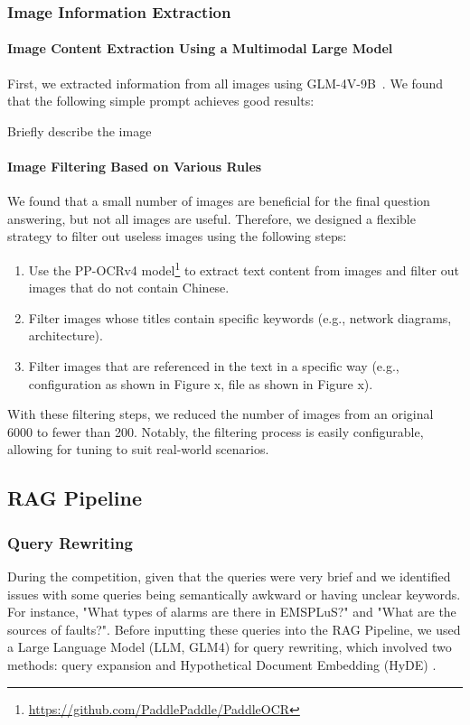 \documentclass[11pt]{article}
\begin{document}
\subsubsection{Image Information Extraction}
\paragraph{Image Content Extraction Using a Multimodal Large Model} First, we extracted information from all images using GLM-4V-9B~\cite{glm2024chatglm}. We found that the following simple prompt achieves good results:
\begin{tcolorbox}\small
Briefly describe the image
\end{tcolorbox}

\paragraph{Image Filtering Based on Various Rules} We found that a small number of images are beneficial for the final question answering, but not all images are useful. Therefore, we designed a flexible strategy to filter out useless images using the following steps:
\begin{enumerate}
    \item Use the PP-OCRv4 model\footnote{\href{https://github.com/PaddlePaddle/PaddleOCR}{https://github.com/PaddlePaddle/PaddleOCR}} to extract text content from images and filter out images that do not contain Chinese.
    \item Filter images whose titles contain specific keywords (e.g., network diagrams, architecture).
    \item Filter images that are referenced in the text in a specific way (e.g., configuration as shown in Figure x, file as shown in Figure x).
\end{enumerate}
With these filtering steps, we reduced the number of images from an original 6000 to fewer than 200. Notably, the filtering process is easily configurable, allowing for tuning to suit real-world scenarios.

\subsection{RAG Pipeline}\label{sec:rag-pipeline}

\subsubsection{Query Rewriting}
\label{subsec:query_edit}
During the competition, given that the queries were very brief and we identified issues with some queries being semantically awkward or having unclear keywords. For instance, "What types of alarms are there in EMSPLuS?" and "What are the sources of faults?". Before inputting these queries into the RAG Pipeline, we used a Large Language Model (LLM, GLM4) for query rewriting, which involved two methods: query expansion and Hypothetical Document Embedding (HyDE) \citep{gao2022precise}.
\end{document}
